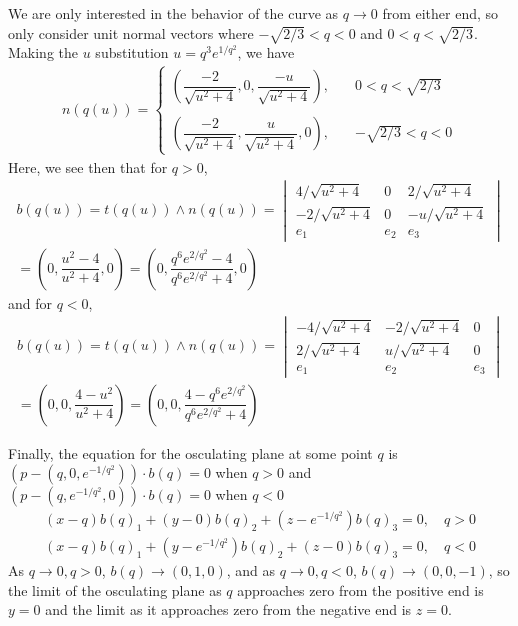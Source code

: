 \documentclass{article}
\begin{document}
	We are only interested in the behavior of the curve as $q \to 0$ from either end, so only consider unit normal vectors where $-\sqrt{2/3} < q < 0$ and $0 < q < \sqrt{2/3}$. Making the $u$ substitution $u = q^3 e^{1/q^2}$, we have
	\begin{gather*}
		n(q(u)) = \begin{cases}
			\left( \dfrac{ -2 }{ \sqrt{ u^2 + 4 } }, 0, \dfrac{ -u }{ \sqrt{ u^2 + 4 } } \right), \quad &0 < q < \sqrt{2/3}
			\\ \\
			\left( \dfrac{ -2 }{ \sqrt{ u^2 + 4 } }, \dfrac{ u }{ \sqrt{ u^2 + 4 } }, 0 \right), \quad &-\sqrt{2/3} < q < 0
		\end{cases}
	\end{gather*}
	Here, we see then that for $q > 0$,
	\begin{gather*}
		b(q(u)) = t(q(u)) \wedge n(q(u)) = \begin{vmatrix}
			4/\sqrt{u^2 + 4} & 0 & 2/\sqrt{u^2 + 4} \\
			-2/\sqrt{u^2 + 4} & 0 & -u/\sqrt{u^2 + 4} \\
			e_1 & e_2 & e_3
		\end{vmatrix} \\
		= \left( 0, \dfrac{u^2 - 4}{u^2 + 4}, 0 \right) = \left( 0, \dfrac{q^6 e^{2/q^2} - 4}{q^6 e^{2/q^2} + 4}, 0 \right)
	\end{gather*}
	and for $q < 0$,
	\begin{gather*}
		b(q(u)) = t(q(u)) \wedge n(q(u)) = \begin{vmatrix}
			-4/\sqrt{u^2 + 4} & -2/\sqrt{u^2 + 4} & 0 \\
			2/\sqrt{u^2 + 4} & u/\sqrt{u^2 + 4} & 0\\
			e_1 & e_2 & e_3
		\end{vmatrix} \\
		= \left( 0, 0, \dfrac{4 - u^2}{u^2 + 4} \right) = \left( 0, 0, \dfrac{4 - q^6 e^{2/q^2}}{q^6 e^{2/q^2} + 4} \right)
	\end{gather*}
	
	Finally, the equation for the osculating plane at some point $q$ is $\left( p - (q, 0, e^{-1/q^2}) \right) \cdot b(q) = 0$ when $q > 0$ and $\left( p - (q, e^{-1/q^2}, 0) \right) \cdot b(q) = 0$ when $q < 0$
	\begin{gather*}
		(x - q) b(q)_1 + (y - 0) b(q)_2 + (z - e^{-1/q^2}) b(q)_3 = 0, \quad q > 0 \\
		(x - q) b(q)_1 + (y - e^{-1/q^2}) b(q)_2 + (z - 0) b(q)_3 = 0, \quad q < 0
	\end{gather*}
	As $q \to 0, q > 0$, $b(q) \to (0, 1, 0)$, and as $q \to 0, q < 0$, $b(q) \to (0, 0, -1)$, so the limit of the osculating plane as $q$ approaches zero from the positive end is $y = 0$ and the limit as it approaches zero from the negative end is $z = 0$.
	
\end{document}
